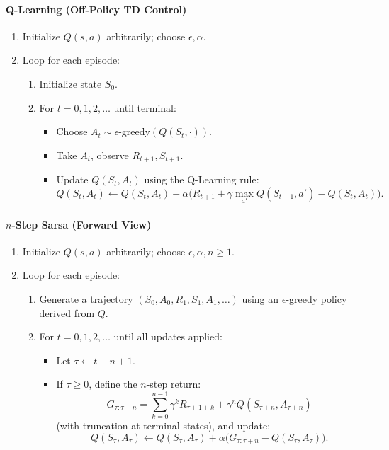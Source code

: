 \documentclass[12pt]{article}
\begin{document}
\paragraph{Q-Learning (Off-Policy TD Control)}
\begin{enumerate}
    \item Initialize $Q(s,a)$ arbitrarily; choose $\epsilon, \alpha$.
    \item Loop for each episode:
    \begin{enumerate}
        \item Initialize state $S_0$.
        \item For $t=0,1,2,\dots$ until terminal:
        \begin{itemize}
            \item Choose $A_t \sim \epsilon$-greedy$(Q(S_t,\cdot))$.
            \item Take $A_t$, observe $R_{t+1}, S_{t+1}$.
            \item Update $Q(S_t,A_t)$ using the Q-Learning rule:
            $$
            Q(S_t,A_t) \leftarrow Q(S_t,A_t) + \alpha \bigl(R_{t+1} + \gamma \max_{a'} Q(S_{t+1},a') - Q(S_t,A_t)\bigr).
            $$
        \end{itemize}
    \end{enumerate}
\end{enumerate}

\paragraph{$n$-Step Sarsa (Forward View)}
\begin{enumerate}
    \item Initialize $Q(s,a)$ arbitrarily; choose $\epsilon, \alpha, n \ge 1$.
    \item Loop for each episode:
    \begin{enumerate}
        \item Generate a trajectory $(S_0,A_0,R_1,S_1,A_1,\dots)$ using an $\epsilon$-greedy policy derived from $Q$.
        \item For $t=0,1,2,\dots$ until all updates applied:
        \begin{itemize}
            \item Let $\tau \leftarrow t-n+1$.
            \item If $\tau \ge 0$, define the $n$-step return:
            $$
            G_{\tau:\tau+n} = \sum_{k=0}^{n-1} \gamma^k R_{\tau+1+k} + \gamma^n Q(S_{\tau+n},A_{\tau+n})
            $$
            (with truncation at terminal states), and update:
            $$
            Q(S_\tau,A_\tau) \leftarrow Q(S_\tau,A_\tau) + \alpha \bigl(G_{\tau:\tau+n} - Q(S_\tau,A_\tau)\bigr).
            $$
        \end{itemize}
    \end{enumerate}
\end{enumerate}
\end{document}

